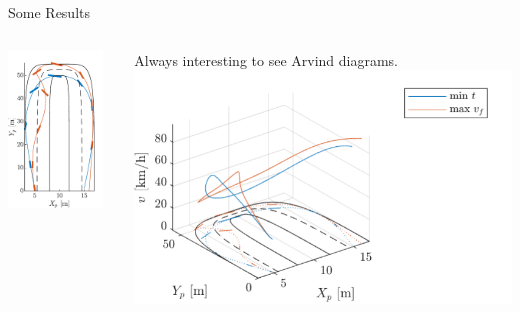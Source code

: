 \begin{frame}{Some Results}
    \begin{columns}
        \begin{column}{0.3\textwidth}
            \centering
            \includegraphics[width=0.9\textwidth]{figures/pep1_part1.pdf}
        \end{column}
        \begin{column}{0.55\textwidth}
            Always interesting to see Arvind diagrams.
            \includegraphics[width=\textwidth]{figures/pep1_part1_arp.pdf}        

\end{column}
\end{columns}
\end{frame}
